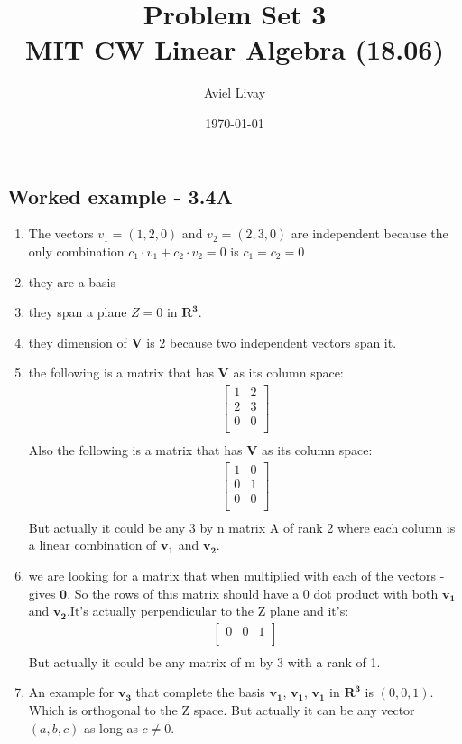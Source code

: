 \documentclass[a4paper,11pt]{article}
\title{%
	Problem Set 3\\
	\large MIT CW Linear Algebra (18.06)
}
\author{Aviel Livay}
\date{\today}
\newcommand{\mybf}[1]{\boldsymbol{#1}}
\begin{document}
\maketitle

\subsection*{Worked example - 3.4A}
\begin{enumerate}[label=\alph*]
\item The vectors $v_1=(1,2,0)$ and $v_2=(2,3,0)$ are independent because the only combination $c_1 \cdot v_1 + c_2 \cdot v_2 = 0$ is $c_1=c_2=0$
\item they are a basis 
\item they span a plane $Z=0$ in $\mybf{R^3}$.
\item they dimension of $\mybf{V}$ is 2 because two independent vectors span it.
\item the following is a matrix that has $\mybf{V}$ as its column space:
\begin{align*}
\begin{bmatrix}
1 & 2 \\
2 & 3 \\
0 & 0 \\
\end{bmatrix}\\
\end{align*}
Also the following is a matrix that has $\mybf{V}$ as its column space: 
\begin{align*}
\begin{bmatrix}
1 & 0 \\
0 & 1 \\
0 & 0 \\
\end{bmatrix}\\
\end{align*}
But actually it could be any 3 by n matrix A of rank 2 where each column is a linear combination of $\mybf{v_1}$ and $\mybf{v_2}$.
\item we are looking for a matrix that when multiplied with each of the vectors - gives $\mybf{0}$.
So the rows of this matrix should have a $0$ dot product with both $\mybf{v_1}$ and $\mybf{v_2}$.It's actually perpendicular to the Z plane and it's:
\begin{align*}
\begin{bmatrix}
0 & 0 & 1 \\
\end{bmatrix}\\
\end{align*}
But actually it could be any matrix of m by 3 with a rank of 1.
\item An example for $\mybf{v_3}$ that complete the basis $\mybf{v_1}$, $\mybf{v_1}$, $\mybf{v_1}$ in $\mybf{R^3}$ is $(0,0,1)$. Which is orthogonal to the Z space. But actually it can be any vector $(a,b,c)$ as long as $c \neq 0$.
\end{enumerate}
\end{document}
